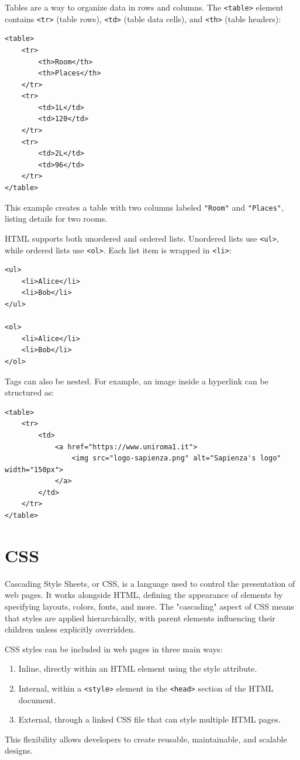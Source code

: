Tables are a way to organize data in rows and columns. The \texttt{<table>} element contains \texttt{<tr>} (table rows), \texttt{<td>} (table data cells), and \texttt{<th>} (table headers):
\begin{verbatim}
<table>
    <tr>
        <th>Room</th>
        <th>Places</th>
    </tr>
    <tr>
        <td>1L</td>
        <td>120</td>
    </tr>
    <tr>
        <td>2L</td>
        <td>96</td>
    </tr>
</table>
\end{verbatim}
This example creates a table with two columns labeled \texttt{"Room"} and \texttt{"Places"}, listing details for two rooms.

HTML supports both unordered and ordered lists. Unordered lists use \texttt{<ul>}, while ordered lists use \texttt{<ol>}. Each list item is wrapped in \texttt{<li>}:
\begin{verbatim}
<ul>
    <li>Alice</li>
    <li>Bob</li>
</ul>

<ol>
    <li>Alice</li>
    <li>Bob</li>
</ol>
\end{verbatim}
Tags can also be nested. For example, an image inside a hyperlink can be structured as:
\begin{verbatim}
<table>
    <tr>
        <td>
            <a href="https://www.uniroma1.it">
                <img src="logo-sapienza.png" alt="Sapienza's logo" width="150px">
            </a>
        </td>
    </tr>
</table>
\end{verbatim}

\section{CSS}
Cascading Style Sheets, or CSS, is a language used to control the presentation of web pages. It works alongside HTML, defining the appearance of elements by specifying layouts, colors, fonts, and more. The "cascading" aspect of CSS means that styles are applied hierarchically, with parent elements influencing their children unless explicitly overridden.

CSS styles can be included in web pages in three main ways:
\begin{enumerate}
    \item Inline, directly within an HTML element using the style attribute.
    \item Internal, within a \texttt{<style>} element in the \texttt{<head>} section of the HTML document.
    \item External, through a linked CSS file that can style multiple HTML pages.
\end{enumerate}
This flexibility allows developers to create reusable, maintainable, and scalable designs.

